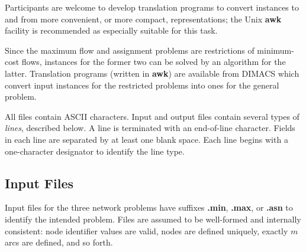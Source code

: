 Participants are welcome to develop translation programs to convert
instances to and from more convenient, or more compact, representations;
the Unix {\bf awk} facility is recommended as especially suitable
for this task.   

Since the maximum flow and assignment problems are restrictions 
of minimum-cost flows, instances for the former two 
can be solved by an algorithm for the latter. 
Translation programs (written in {\bf awk})  
are available from DIMACS which convert input instances for the 
restricted problems into ones for the general problem.  

All files contain ASCII characters. 
Input and output files contain several types of {\em  lines}, described below. 
A line is terminated with an end-of-line character.  Fields in each line 
are separated by at least one blank space.  Each line begins with a
one-character designator to identify the line type. 

\subsection{Input Files} 

Input files for the three network problems have suffixes 
{\bf .min}, {\bf .max}, or {\bf .asn} to identify the intended problem. 
Files are assumed to be well-formed 
and internally consistent: node identifier values are valid, 
nodes are defined uniquely, exactly $m$ arcs 
are defined, and so forth.  

